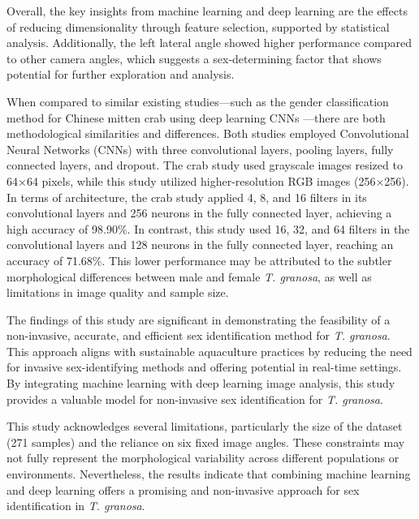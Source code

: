 Overall, the key insights from machine learning and deep learning are the effects of reducing dimensionality through feature selection, supported by statistical analysis. Additionally, the left lateral angle showed higher performance compared to other camera angles, which suggests a sex-determining factor that shows potential for further exploration and analysis.

When compared to similar existing studies—such as the gender classification method for Chinese mitten crab using deep learning CNNs \cite{cui2020}—there are both methodological similarities and differences. Both studies employed Convolutional Neural Networks (CNNs) with three convolutional layers, pooling layers, fully connected layers, and dropout. The crab study used grayscale images resized to 64×64 pixels, while this study utilized higher-resolution RGB images (256×256). In terms of architecture, the crab study applied 4, 8, and 16 filters in its convolutional layers and 256 neurons in the fully connected layer, achieving a high accuracy of 98.90\%. In contrast, this study used 16, 32, and 64 filters in the convolutional layers and 128 neurons in the fully connected layer, reaching an accuracy of 71.68\%. This lower performance may be attributed to the subtler morphological differences between male and female \textit{T. granosa}, as well as limitations in image quality and sample size.

The findings of this study are significant in demonstrating the feasibility of a non-invasive, accurate, and efficient sex identification method for \textit{T. granosa}. This approach aligns with sustainable aquaculture practices by reducing the need for invasive sex-identifying methods and offering potential in real-time settings. By integrating machine learning with deep learning image analysis, this study provides a valuable model for non-invasive sex identification for \textit{T. granosa}.

This study acknowledges several limitations, particularly the size of the dataset (271 samples) and the reliance on six fixed image angles. These constraints may not fully represent the morphological variability across different populations or environments. Nevertheless, the results indicate that combining machine learning and deep learning offers a promising and non-invasive approach for sex identification in \textit{T. granosa}.